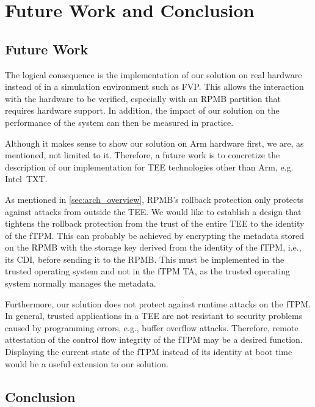 
\chapter{Future Work and Conclusion}\label{chapter:future_work_and_conclusion}

\section{Future Work}

The logical consequence is the implementation of our solution on real hardware instead of in a simulation environment such as FVP\@.
This allows the interaction with the hardware to be verified, especially with an RPMB partition that requires hardware support.
In addition, the impact of our solution on the performance of the system can then be measured in practice.

Although it makes sense to show our solution on Arm hardware first, we are, as mentioned, not limited to it.
Therefore, a future work is to concretize the description of our implementation for TEE technologies other than Arm, e.g. Intel~TXT\@.

As mentioned in \autoref{sec:arch_overview}, RPMB's rollback protection only protects against attacks from outside the TEE\@.
We would like to establish a design that tightens the rollback protection from the trust of the entire TEE to the identity of the fTPM\@.
This can probably be achieved by encrypting the metadata stored on the RPMB with the storage key derived from the identity of the fTPM, i.e., its CDI, before sending it to the RPMB\@.
This must be implemented in the trusted operating system and not in the fTPM TA, as the trusted operating system normally manages the metadata.

Furthermore, our solution does not protect against runtime attacks on the fTPM\@.
In general, trusted applications in a TEE are not resistant to security problems caused by programming errors, e.g., buffer overflow attacks.
Therefore, remote attestation of the control flow integrity of the fTPM may be a desired function.
Displaying the current state of the fTPM instead of its identity at boot time would be a useful extension to our solution.


\section{Conclusion}

